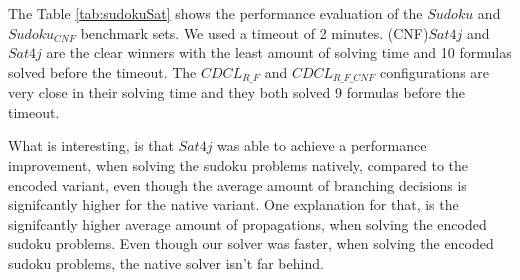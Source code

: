 The Table \ref{tab:sudokuSat} shows the performance evaluation of the $Sudoku$ and $Sudoku_{CNF}$ benchmark sets. We used a timeout of 2 minutes. (CNF)$Sat4j$ and $Sat4j$ are the clear winners with the least amount of solving time and 10 formulas solved before the timeout. The $CDCL_{R\_F}$ and $CDCL_{R\_F\_CNF}$ configurations are very close in their solving time and they both solved 9 formulas before the timeout.

What is interesting, is that $Sat4j$ was able to achieve a performance improvement, when solving the sudoku problems natively, compared to the encoded variant, even though the average amount of branching decisions is signifcantly higher for the native variant. One explanation for that, is the signifcantly higher average amount of propagations, when solving the encoded sudoku problems. Even though our solver was faster, when solving the encoded sudoku problems, the native solver isn't far behind.